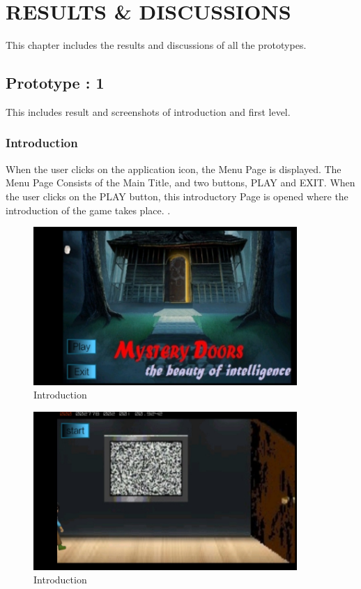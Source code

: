 \chapter{RESULTS \& DISCUSSIONS}
This chapter includes the results and discussions of all the prototypes.

\section{Prototype : 1}
\hspace{1cm} This includes result and screenshots of introduction and first level.

\subsection{Introduction}
\hspace{1cm}When the user clicks on the application icon, the Menu Page is displayed.
The Menu Page Consists of the Main Title, and two buttons, PLAY and EXIT.
When the user clicks on the PLAY button, this introductory Page is opened where 
the introduction of the game takes place.
 \cite{DBLP:journals/ivc/KadyrovP03}.\\
\begin{figure}[htbp]
	\centering
	\includegraphics[width=10cm,height=6cm]{1.jpg}
	\caption{Introduction}
\end{figure}
\begin{figure}[htbp]
	\centering
	\includegraphics[width=10cm,height=6cm]{2.jpg}
	\caption{Introduction}
\end{figure}
